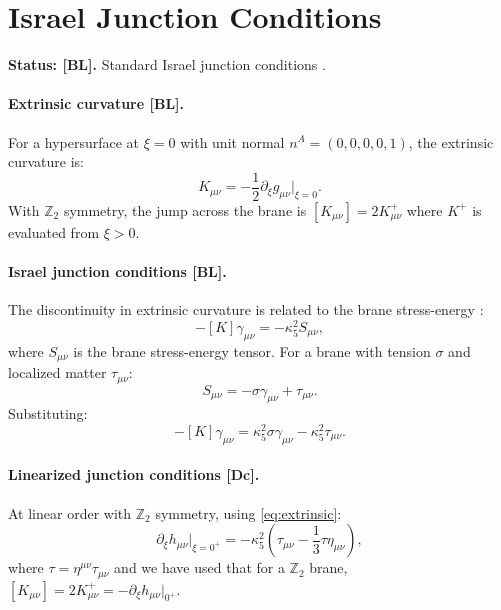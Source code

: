 \documentclass[11pt,a4paper]{article}
\newcommand{\tagBL}{\textcolor{blue!70!black}{[BL]}}
\newcommand{\tagDc}{\textcolor{purple!70!black}{[Dc]}}
\begin{document}
\section{Israel Junction Conditions}
\label{sec:junction}

\begin{statusbox}
\textbf{Status: \tagBL{}.}
Standard Israel junction conditions \cite{Israel1966}.
\end{statusbox}

\paragraph{Extrinsic curvature \tagBL{}.}
For a hypersurface at $\xi = 0$ with unit normal $n^A = (0,0,0,0,1)$, the extrinsic curvature is:
\begin{equation}
    K_{\mu\nu} = -\frac{1}{2} \partial_\xi g_{\mu\nu} \big|_{\xi=0}.
    \label{eq:extrinsic}
\end{equation}
With $\mathbb{Z}_2$ symmetry, the jump across the brane is $[K_{\mu\nu}] = 2 K_{\mu\nu}^+$ where $K^+$ is evaluated from $\xi > 0$.

\paragraph{Israel junction conditions \tagBL{}.}
The discontinuity in extrinsic curvature is related to the brane stress-energy \cite{Israel1966}:
\begin{equation}
    [K_{\mu\nu}] - [K] \gamma_{\mu\nu} = -\kappa_5^2 S_{\mu\nu},
    \label{eq:israel}
\end{equation}
where $S_{\mu\nu}$ is the brane stress-energy tensor.
For a brane with tension $\sigma$ and localized matter $\tau_{\mu\nu}$:
\begin{equation}
    S_{\mu\nu} = -\sigma \gamma_{\mu\nu} + \tau_{\mu\nu}.
\end{equation}
Substituting:
\begin{equation}
    [K_{\mu\nu}] - [K] \gamma_{\mu\nu} = \kappa_5^2 \sigma \gamma_{\mu\nu} - \kappa_5^2 \tau_{\mu\nu}.
    \label{eq:israel_expanded}
\end{equation}

\paragraph{Linearized junction conditions \tagDc{}.}
At linear order with $\mathbb{Z}_2$ symmetry, using \eqref{eq:extrinsic}:
\begin{equation}
    \partial_\xi h_{\mu\nu}\big|_{\xi=0^+} = -\kappa_5^2 \left( \tau_{\mu\nu} - \frac{1}{3} \tau \eta_{\mu\nu} \right),
    \label{eq:junction_linear}
\end{equation}
where $\tau = \eta^{\mu\nu} \tau_{\mu\nu}$ and we have used that for a $\mathbb{Z}_2$ brane, $[K_{\mu\nu}] = 2 K_{\mu\nu}^+ = -\partial_\xi h_{\mu\nu}|_{0^+}$.
\end{document}

